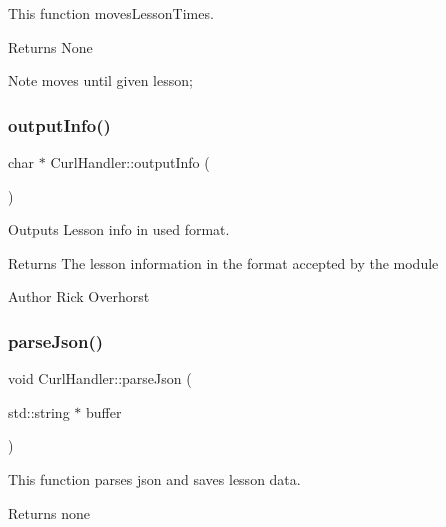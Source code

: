 This function moves\+Lesson\+Times. 

\begin{DoxyReturn}{Returns}
None 
\end{DoxyReturn}
\begin{DoxyNote}{Note}
moves until given lesson; 
\end{DoxyNote}
\mbox{\label{classCurlHandler_a5d840e40c7e2d11297514947e957d542}} 
\subsubsection{\texorpdfstring{output\+Info()}{outputInfo()}}
{\footnotesize\ttfamily char $\ast$ Curl\+Handler\+::output\+Info (\begin{DoxyParamCaption}{ }\end{DoxyParamCaption})}



Outputs Lesson info in used format. 

\begin{DoxyReturn}{Returns}
The lesson information in the format accepted by the module 
\end{DoxyReturn}
\begin{DoxyAuthor}{Author}
Rick Overhorst 
\end{DoxyAuthor}
\mbox{\label{classCurlHandler_a2e63afaaf3fd64263505f90821f02d05}} 
\subsubsection{\texorpdfstring{parse\+Json()}{parseJson()}}
{\footnotesize\ttfamily void Curl\+Handler\+::parse\+Json (\begin{DoxyParamCaption}\item[{std\+::string $\ast$}]{buffer }\end{DoxyParamCaption})}



This function parses json and saves lesson data. 

\begin{DoxyReturn}{Returns}
none 
\end{DoxyReturn}
\mbox{\label{classCurlHandler_aff816fc825c4ad52b377c808a900d07d}} 
